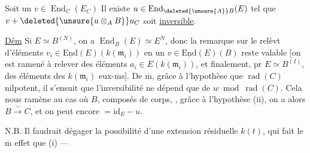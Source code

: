 Soit un $v\in\operatorname{End}_C(E_C)$
Il existe $u\in\operatorname{End}_{\deleted{\unsure{A}}B}(E)$
tel que $v+\deleted{\unsure{u\otimes_A B}}u_C$ soit \uline{inversible}.

\uline{Dém} Si $E\simeq B^{(N)}$, on a $\operatorname{End}_B(E)\simeq E^N$,
donc la remarque sur le relèvt d'éléments $v_i\in
\underline{\mathrm{End}}(E)(k(\mathfrak m_i))$ en un $v\in\underline{\mathrm{End}}(E)(B)$ reste valable
[on est ramené à relever des éléments 
$a_i\in E(k(\mathfrak m_i))$, et finalement, pr $E\simeq B^{(I)}$, des
éléments des $k(\mathfrak m_i)$ eux-$\overline{\mathrm m}\mathrm s$]. De $\overline{\mathrm m}$, grâce à
l'hypothèse que $\operatorname{rad}(C)$ nilpotent, il s'ensuit que
l'inversibilité ne dépend que de $w\bmod\operatorname{rad}(C)$.
Cela nous ramène au cas où $B$,  composés de corps,
,  grâce à l'hypothèse (ii), on a
alors $B\xrightarrow{\sim}C$, et on peut encore $=\mathrm{id}_E-u$.

N.B. Il faudrait dégager la possibilité d'une
extension résiduelle  $k(t)$, qui fait
le $\overline{\mathrm m}$ effet que (i) ---
